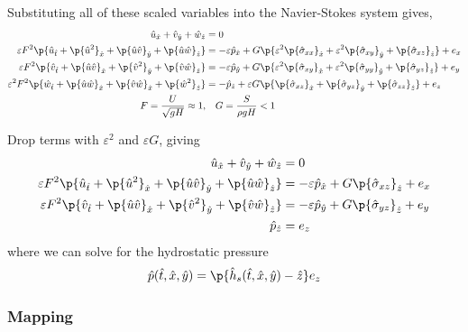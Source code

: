   Substituting all of these scaled variables into the Navier-Stokes system gives,
  \begin{align*}
    \hat{u}_{\hat{x}} + \hat{v}_{\hat{y}} + \hat{w}_{\hat{z}} &= 0 \\
    \varepsilon F^2 \p{\hat{u}_{\hat{t}} + \p{\hat{u}^2}_{\hat{x}}
      + \p{\hat{u}\hat{v}}_{\hat{y}} + \p{\hat{u}\hat{w}}_{\hat{z}}}
      &= -\varepsilon \hat{p}_{\hat{x}}
      + G
      \p{\varepsilon^2 \p{\hat{\sigma}_{xx}}_{\hat{x}}
        + \varepsilon^2 \p{\hat{\sigma}_{xy}}_{\hat{y}}
        + \p{\hat{\sigma}_{xz}}_{\hat{z}}}
      + e_x \\
    \varepsilon F^2
      \p{\hat{v}_{\hat{t}}
        + \p{\hat{u}\hat{v}}_{\hat{x}}
        + \p{\hat{v}^2}_{\hat{y}}
        + \p{\hat{v}\hat{w}}_{\hat{z}}
      }
      &=
      -\varepsilon \hat{p}_{\hat{y}}
      + G
      \p{\varepsilon^2 \p{\hat{\sigma}_{xy}}_{\hat{x}}
        + \varepsilon^2 \p{\hat{\sigma}_{yy}}_{\hat{y}}
        + \p{\hat{\sigma}_{yz}}_{\hat{z}}
      } + e_y \\
    \varepsilon^2 F^2
      \p{\hat{w}_{\hat{t}}
        + \p{\hat{u}\hat{w}}_{\hat{x}}
        + \p{\hat{v}\hat{w}}_{\hat{x}}
        + \p{\hat{w}^2}_{\hat{z}}
      }
      &= - \hat{p}_{\hat{z}}
      + \varepsilon G
      \p{\p{\hat{\sigma}_{xz}}_{\hat{x}}
        + \p{\hat{\sigma}_{yz}}_{\hat{y}}
        + \p{\hat{\sigma}_{zz}}_{\hat{z}}
      } + e_z \\
      F = \frac{U}{\sqrt{gH}} \approx 1, &\quad G = \frac{S}{\rho g H} < 1
  \end{align*}

  Drop terms with \(\varepsilon^2\) and \(\varepsilon G\), giving
  \begin{align*}
    \hat{u}_{\hat{x}} + \hat{v}_{\hat{y}} + \hat{w}_{\hat{z}} &= 0 \\
    \varepsilon F^2 \p{\hat{u}_{\hat{t}} + \p{\hat{u}^2}_{\hat{x}}
      + \p{\hat{u}\hat{v}}_{\hat{y}} + \p{\hat{u}\hat{w}}_{\hat{z}}}
      &= -\varepsilon \hat{p}_{\hat{x}}
      + G \p{\hat{\sigma}_{xz}}_{\hat{z}}
      + e_x \\
    \varepsilon F^2
      \p{\hat{v}_{\hat{t}}
        + \p{\hat{u}\hat{v}}_{\hat{x}}
        + \p{\hat{v}^2}_{\hat{y}}
        + \p{\hat{v}\hat{w}}_{\hat{z}}
      }
      &=
      -\varepsilon \hat{p}_{\hat{y}}
      + G \p{\hat{\sigma}_{yz}}_{\hat{z}}
      + e_y \\
      \hat{p}_{\hat{z}} &= e_z
  \end{align*}
  where we can solve for the hydrostatic pressure
  \begin{align*}
    \hat{p}(\hat{t}, \hat{x}, \hat{y}) = \p{\hat{h}_s(\hat{t}, \hat{x}, \hat{y}) - \hat{z}} e_z
  \end{align*}

\subsubsection{Mapping}



%
%

